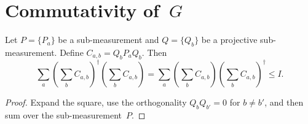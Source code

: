 \section{Commutativity of~$G$}
\label{sec:G-commutes}

\begin{lemma}\label{lem:normalization-condition}
	\leanok
	Let $P=\{P_a\}$ be a sub-measurement and $Q=\{Q_b\}$ be a projective sub-measurement.
	Define $C_{a,b}=Q_b P_a Q_b$.
	Then
	\[
		\sum_a \left(\sum_b C_{a,b}\right)^\dagger \left(\sum_b C_{a,b}\right)
		=
		\sum_a \left(\sum_b C_{a,b}\right)\left(\sum_b C_{a,b}\right)^\dagger
		\le I.
	\]
\end{lemma}
\begin{proof}
	\leanok
	Expand the square, use the orthogonality $Q_b Q_{b'}=0$ for $b \neq b'$, and then sum over the sub-measurement~$P$.
\end{proof}

